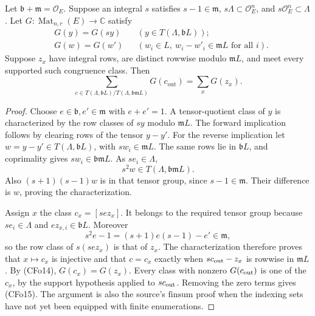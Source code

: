 \begin{srlemma}
\label{lem:ftb-cover-tensor-reindex}
Let \(\mathfrak b+\mathfrak m=\mathcal O_E\). Suppose an integral
\(s\) satisfies \(s-1\in\mathfrak m\),
\(s\Lambda\subset\mathcal O_E^n\), and
\(s\mathcal O_E^n\subset\Lambda\).
Let \(G:\operatorname{Mat}_{n,r}(E)\to\mathbb C\) satisfy
\[
 \begin{aligned}
 &G(y)=G(sy) &&(y\in T(\Lambda,\mathfrak bL));\\
 &G(w)=G(w')&&
    (w_i\in L,\ w_i-w'_i\in\mathfrak mL\text{ for all }i).
 \end{aligned}                                             \tag{CFo14}
\]
Suppose \(z_x\) have integral rows, are distinct rowwise modulo
\(\mathfrak mL\), and meet every supported such congruence class.
Then
\[
 \sum_{c\in T(\Lambda,\mathfrak bL)/
                    T(\Lambda,\mathfrak b\mathfrak mL)}
                 G(c_{\mathrm{out}})=\sum_xG(z_x).       \tag{CFo15}
\]
\end{srlemma}

\begin{proof}
Choose \(e\in\mathfrak b,e'\in\mathfrak m\) with \(e+e'=1\).
A tensor-quotient class of \(y\) is characterized by the row
classes of \(sy\) modulo \(\mathfrak mL\).
The forward implication follows by clearing rows of the
tensor \(y-y'\).
For the reverse implication let
\(w=y-y'\in T(\Lambda,\mathfrak bL)\), with
\(sw_i\in\mathfrak mL\).
The same rows lie in \(\mathfrak bL\), and coprimality gives
\(sw_i\in\mathfrak b\mathfrak mL\). As \(se_i\in\Lambda\),
\[
                   s^2w\in T(\Lambda,\mathfrak b\mathfrak mL).
\]
Also \((s+1)(s-1)w\) is in that tensor group, since
\(s-1\in\mathfrak m\). Their difference is \(w\), proving
the characterization.

Assign \(x\) the class \(c_x=[sez_x]\).
It belongs to the required tensor group because \(se_i\in\Lambda\)
and \(ez_{x,i}\in\mathfrak bL\).
Moreover
\[
 s^2e-1=(s+1)e(s-1)-e'\in\mathfrak m,
\]
so the row class of \(s(sez_x)\) is that of \(z_x\).
The characterization therefore proves that \(x\mapsto c_x\)
is injective and that
\(c=c_x\) exactly when \(sc_{\rm out}-z_x\) is rowwise in
\(\mathfrak mL\).
By (CFo14), \(G(c_x)=G(z_x)\).
Every class with nonzero \(G(c_{\rm out})\) is one of the \(c_x\),
by the support hypothesis applied to \(sc_{\rm out}\).
Removing the zero terms gives (CFo15).
The argument is also the source's \(\mathrm{finsum}\) proof when
the indexing sets have not yet been equipped with finite
enumerations.
\end{proof}


